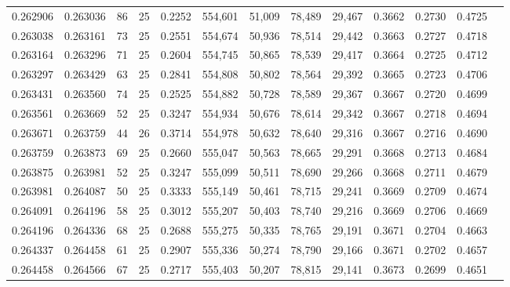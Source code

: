 \begin{tabular}{rrrrrrrrrrrrr}
0.262906 & 0.263036 &    86 &  25 &                                     0.2252 & 554,601 &  51,009 &  78,489 &  29,467 & 0.3662 & 0.2730 & 0.4725 \\
0.263038 & 0.263161 &    73 &  25 &                                     0.2551 & 554,674 &  50,936 &  78,514 &  29,442 & 0.3663 & 0.2727 & 0.4718 \\
0.263164 & 0.263296 &    71 &  25 &                                     0.2604 & 554,745 &  50,865 &  78,539 &  29,417 & 0.3664 & 0.2725 & 0.4712 \\
0.263297 & 0.263429 &    63 &  25 &                                     0.2841 & 554,808 &  50,802 &  78,564 &  29,392 & 0.3665 & 0.2723 & 0.4706 \\
0.263431 & 0.263560 &    74 &  25 &                                     0.2525 & 554,882 &  50,728 &  78,589 &  29,367 & 0.3667 & 0.2720 & 0.4699 \\
0.263561 & 0.263669 &    52 &  25 &                                     0.3247 & 554,934 &  50,676 &  78,614 &  29,342 & 0.3667 & 0.2718 & 0.4694 \\
0.263671 & 0.263759 &    44 &  26 &                                     0.3714 & 554,978 &  50,632 &  78,640 &  29,316 & 0.3667 & 0.2716 & 0.4690 \\
0.263759 & 0.263873 &    69 &  25 &                                     0.2660 & 555,047 &  50,563 &  78,665 &  29,291 & 0.3668 & 0.2713 & 0.4684 \\
0.263875 & 0.263981 &    52 &  25 &                                     0.3247 & 555,099 &  50,511 &  78,690 &  29,266 & 0.3668 & 0.2711 & 0.4679 \\
0.263981 & 0.264087 &    50 &  25 &                                     0.3333 & 555,149 &  50,461 &  78,715 &  29,241 & 0.3669 & 0.2709 & 0.4674 \\
0.264091 & 0.264196 &    58 &  25 &                                     0.3012 & 555,207 &  50,403 &  78,740 &  29,216 & 0.3669 & 0.2706 & 0.4669 \\
0.264196 & 0.264336 &    68 &  25 &                                     0.2688 & 555,275 &  50,335 &  78,765 &  29,191 & 0.3671 & 0.2704 & 0.4663 \\
0.264337 & 0.264458 &    61 &  25 &                                     0.2907 & 555,336 &  50,274 &  78,790 &  29,166 & 0.3671 & 0.2702 & 0.4657 \\
0.264458 & 0.264566 &    67 &  25 &                                     0.2717 & 555,403 &  50,207 &  78,815 &  29,141 & 0.3673 & 0.2699 & 0.4651 \\

\end{tabular}
